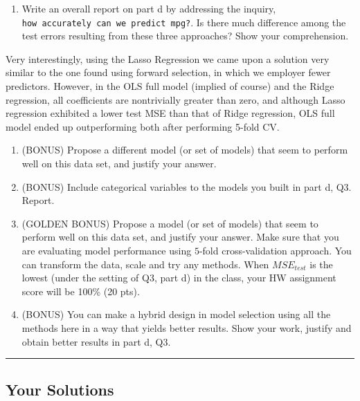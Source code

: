 \documentclass[
]{article}
\providecommand{\tightlist}{%
  \setlength{\itemsep}{0pt}\setlength{\parskip}{0pt}}
\begin{document}
\begin{enumerate}
\def\labelenumi{\alph{enumi}.}
\setcounter{enumi}{4}
\tightlist
\item
  Write an overall report on part d by addressing the inquiry,
  \texttt{how\ accurately\ can\ we\ predict\ mpg?}. Is there much
  difference among the test errors resulting from these three
  approaches? Show your comprehension.
\end{enumerate}

Very interestingly, using the Lasso Regression we came upon a solution
very similar to the one found using forward selection, in which we
employer fewer predictors. However, in the OLS full model (implied of
course) and the Ridge regression, all coefficients are nontrivially
greater than zero, and although Lasso regression exhibited a lower test
MSE than that of Ridge regression, OLS full model ended up outperforming
both after performing 5-fold CV.

\begin{enumerate}
\def\labelenumi{\alph{enumi}.}
\setcounter{enumi}{5}
\item
  (BONUS) Propose a different model (or set of models) that seem to
  perform well on this data set, and justify your answer.
\item
  (BONUS) Include categorical variables to the models you built in part
  d, Q3. Report.
\item
  (GOLDEN BONUS) Propose a model (or set of models) that seem to perform
  well on this data set, and justify your answer. Make sure that you are
  evaluating model performance using \(5\)-fold cross-validation
  approach. You can transform the data, scale and try any methods. When
  \(MSE_{test}\) is the lowest (under the setting of Q3, part d) in the
  class, your HW assignment score will be 100\% (20 pts).
\item
  (BONUS) You can make a hybrid design in model selection using all the
  methods here in a way that yields better results. Show your work,
  justify and obtain better results in part d, Q3.
\end{enumerate}

\newpage

\begin{center}\rule{0.5\linewidth}{0.5pt}\end{center}

\hypertarget{your-solutions}{%
\subsection{Your Solutions}\label{your-solutions}}
\end{document}
